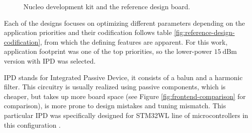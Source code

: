 \begin{figure}
    \centering
    \caption{\label{fig:nucleo-and-reference}Nucleo development kit and the reference design board.}
\end{figure}

Each of the designs focuses on optimizing different parameters depending on the application priorities and their codification follows table \ref{fig:reference-design-codification}, from which the defining features are apparent. For this work, application footprint was one of the top priorities, so the lower-power $15~\mathrm{dBm}$ version with IPD was selected.

IPD stands for Integrated Passive Device, it consists of a balun and a harmonic filter. This circuitry is usually realized using passive components, which is cheaper, but takes up more board space (see Figure \ref{fig:frontend-comparison} for comparison), is more prone to design mistakes and tuning mismatch. This particular IPD was specifically designed for STM32WL line of microcontrollers in this configuration \cite{stmicroelectronics_balfhb-wl-05d3_2024}.

